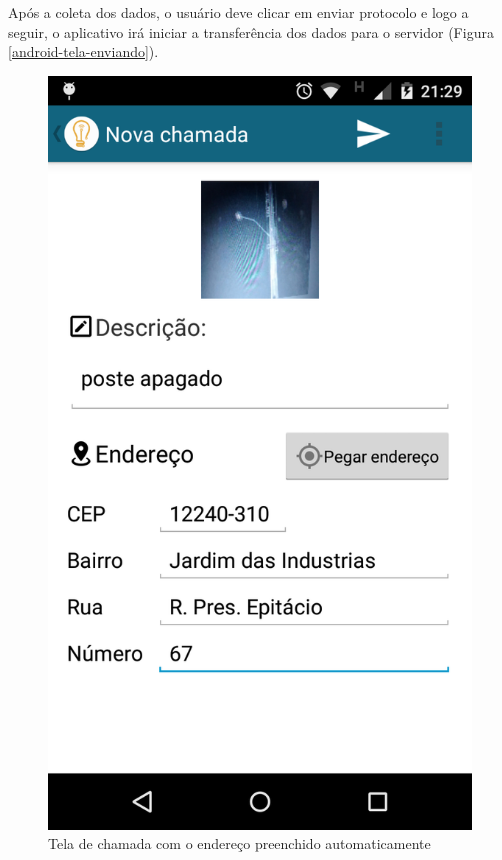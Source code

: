 \documentclass[
	article,			%
	11pt,				%
	oneside,			%
	a4paper,			%
	english,			%
	brazil,				%
	sumario=tradicional
	]{abntex2}
\begin{document}
Após a coleta dos dados, o usuário deve clicar em enviar protocolo e logo a seguir, o aplicativo irá iniciar a transferência dos dados para o servidor (Figura \ref{android-tela-enviando}).

\clearpage

\begin{figure}[!htbp]
 \centering
  \begin{minipage}{0.4\textwidth}
    \centering
    \caption{\label{android-tela-nova-chamada-endereco}Tela de chamada com o endereço preenchido automaticamente}
    \includegraphics[scale=0.1]{android/5.png}

\end{minipage}
\end{figure}
\end{document}
